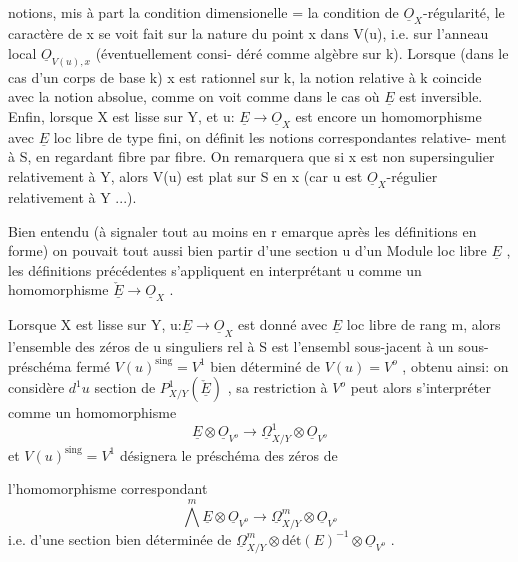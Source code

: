 
notions, mis à part la condition dimensionelle = la condition de
$\underline{O}_X$-régularité, le caractère de x se voit   fait sur la nature du
point x dans V(u), i.e. sur l'anneau local $\underline{O}_{V(u),x}$ (éventuellement consi-%
déré comme algèbre sur k). Lorsque (dans le cas d'un corps de base k)
x est rationnel sur k, la notion relative à k coincide avec la notion
absolue, comme on voit  comme dans le cas où $\underline{E}$ est inversible. Enfin,
lorsque X est lisse sur Y, et u: $\underline{E}\to\underline{O}_X$ est encore un homomorphisme avec
$\underline{E}$ loc libre de type fini, on définit les notions correspondantes relative-%
ment à S, en regardant fibre par fibre. On remarquera que si x est
non supersingulier relativement à Y, alors V(u) est plat sur S  en
x (car u est $\underline{O}_X$-régulier relativement à Y ...).

\placedmargin{$\big|$} Bien entendu (à signaler tout au moins en r emarque après les
définitions en forme) on pouvait tout aussi bien partir d'une section u
d'un Module loc libre $\underline{E}$ , les définitions précédentes s'appliquent en
interprétant u comme un homomorphisme $\check{\underline{E}}\longrightarrow\underline{O}_X$ .

Lorsque X est lisse sur Y, u:$\underline{E}\longrightarrow\underline{O}_X$ est donné avec $\underline{E}$ loc libre
de rang m, alors l'ensemble des  zéros de u singuliers rel à S est l'ensembl
sous-jacent à un sous-préschéma fermé $V(u)^{\mathrm{sing}} = V^1$ bien déterminé de
$V(u)=V^o$ , obtenu ainsi: on considère $d^1u$ section de $P^1_{X/Y}(\check{\underline{E}})$ , sa
restriction à $V^o$ peut alors s'interpréter comme un homomorphisme
\[ \underline{E}\otimes\underline{O}_{V^o} \longrightarrow \underline{\Omega}^1_{X/Y}\otimes\underline{O}_{V^o} \]
et $V(u)^{\mathrm{sing}}=V^1$ désignera le préschéma des zéros de 

 l'homomorphisme correspondant
\[ \bigwedge^m\underline{E}\otimes\underline{O}_{V^o} \to \underline{\Omega}^m_{X/Y}\otimes\underline{O}_{V^o} \]
i.e. d'une section bien déterminée de $\underline{\Omega}^m_{X/Y}\otimes\mathrm{dét}(E)^{-1}\otimes\underline{O}_{V^o}$ .

